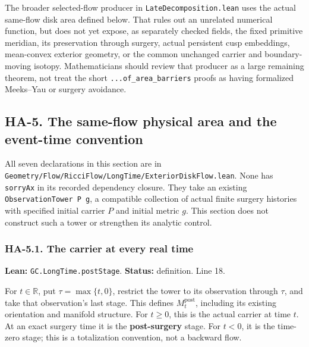 \documentclass[
  letterpaper,
  11pt]{article}
\begin{document}
The broader selected-flow producer in
{\small\texttt{Late\allowbreak{}Decomposition.\allowbreak{}lean}} uses
the actual same-flow disk area defined below. That rules out an
unrelated numerical function, but does not yet expose, as separately
checked fields, the fixed primitive meridian, its preservation through
surgery, actual persistent cusp embeddings, mean-convex exterior
geometry, or the common unchanged carrier and boundary-moving isotopy.
Mathematicians should review that producer as a large remaining theorem,
not treat the short
{\small\texttt{.\allowbreak{}.\allowbreak{}.\allowbreak{}of\_\allowbreak{}area\_\allowbreak{}barriers}}
proofs as having formalized Meeks--Yau or surgery avoidance.

\subsection{HA-5. The same-flow physical area and the event-time
convention}\label{ha-5}

All seven declarations in this section are in
{\small\texttt{Geometry/\allowbreak{}Flow/\allowbreak{}Ricci\allowbreak{}Flow/\allowbreak{}Long\allowbreak{}Time/\allowbreak{}Exterior\allowbreak{}Disk\allowbreak{}Flow.\allowbreak{}lean}}.
None has {\small\texttt{sorry\allowbreak{}Ax}} in its recorded
dependency closure. They take an existing
{\small\texttt{Observation\allowbreak{}Tower P g}}, a compatible
collection of actual finite surgery histories with specified initial
carrier \(P\) and initial metric \(g\). This section does not construct
such a tower or strengthen its analytic control.

\subsubsection{HA-5.1. The carrier at every real time}\label{ha-5-1}

\textbf{Lean:}
{\small\texttt{GC.\allowbreak{}Long\allowbreak{}Time.\allowbreak{}post\allowbreak{}Stage}}.
\textbf{Status:} definition. Line 18.

For \(t\in\mathbb R\), put \(\tau=\max\{t,0\}\), restrict the tower to
its observation through \(\tau\), and take that observation's last
stage. This defines \(M_t^{\mathrm{post}}\), including its existing
orientation and manifold structure. For \(t\ge0\), this is the actual
carrier at time \(t\). At an exact surgery time it is the
\textbf{post-surgery} stage. For \(t<0\), it is the time-zero stage;
this is a totalization convention, not a backward flow.
\end{document}
